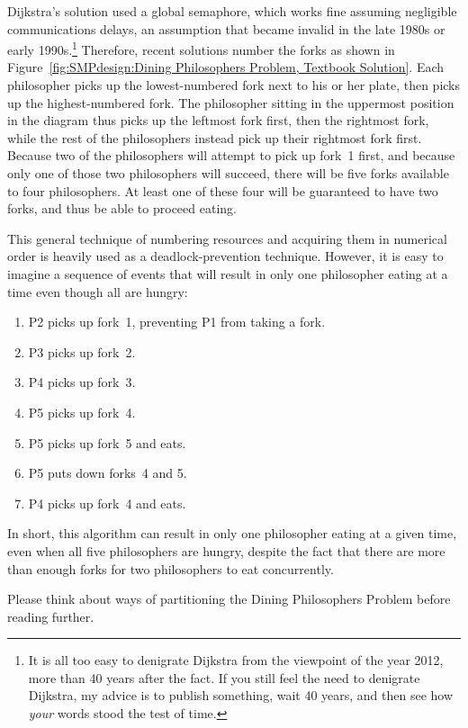 Dijkstra's solution used a global semaphore, which works fine assuming
negligible communications delays, an assumption that became invalid
in the late 1980s or early 1990s.\footnote{
	It is all too easy to denigrate Dijkstra from the viewpoint
	of the year 2012, more than 40 years after the fact.
	If you still feel the need to denigrate Dijkstra, my advice
	is to publish something, wait 40 years, and then see
	how \emph{your} words stood the test of time.}
Therefore, recent solutions number the forks as shown in
Figure~\ref{fig:SMPdesign:Dining Philosophers Problem, Textbook Solution}.
Each philosopher picks up the lowest-numbered fork next to his or her
plate, then picks up the highest-numbered fork.
The philosopher sitting in the uppermost position in the diagram thus
picks up the leftmost fork first, then the rightmost fork, while the
rest of the philosophers instead pick up their rightmost fork first.
Because two of the philosophers will attempt to pick up fork~1 first,
and because only one of those two philosophers will succeed,
there will be five forks available to four philosophers.
At least one of these four will be guaranteed to have two forks,
and thus be able to proceed eating.

This general technique of numbering resources and acquiring them in
numerical order is heavily used as a deadlock-prevention technique.
However, it is easy to imagine a sequence of events that will result
in only one philosopher eating at a time even though all are hungry:

\begin{enumerate}
    \item P2 picks up fork~1, preventing P1 from taking a fork.
    \item P3 picks up fork~2.
    \item P4 picks up fork~3.
    \item P5 picks up fork~4.
    \item P5 picks up fork~5 and eats.
    \item P5 puts down forks~4 and 5.
    \item P4 picks up fork~4 and eats.
\end{enumerate}

In short, this algorithm can result in only one philosopher eating at
a given time, even when all five philosophers are hungry,
despite the fact that there are more than enough forks for two
philosophers to eat concurrently.

Please think about ways of partitioning the Dining Philosophers Problem
before reading further.
\cleardoublepage



